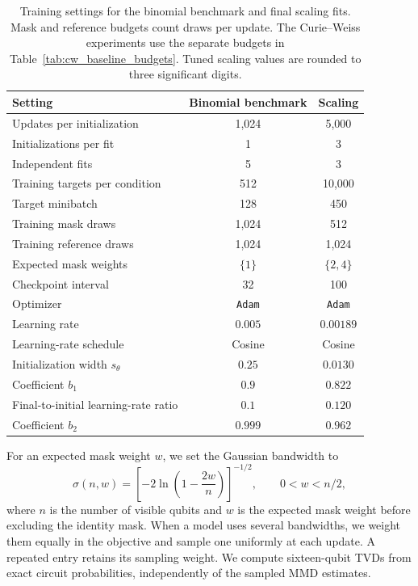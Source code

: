 \documentclass[pra,aps,10pt,twocolumn,floatfix,superscriptaddress, notitlepage,longbibliography]{revtex4-2}
\begin{document}
\begin{table}[!htbp]
\centering
\caption{Training settings for the binomial benchmark and final scaling fits. Mask and reference budgets count draws per update. The Curie--Weiss experiments use the separate budgets in Table~\ref{tab:cw_baseline_budgets}. Tuned scaling values are rounded to three significant digits.}
\label{tab:training_hyperparams}
\small
\begin{tabular}{lcc}
\toprule
Setting & Binomial benchmark & Scaling \\
\midrule
Updates per initialization & 1,024 & 5,000 \\
Initializations per fit & 1 & 3 \\
Independent fits & 5 & 3 \\
Training targets per condition & 512 & 10,000 \\
Target minibatch & 128 & 450 \\
Training mask draws & 1,024 & 512 \\
Training reference draws & 1,024 & 1,024 \\
Expected mask weights & $\{1\}$ & $\{2,4\}$ \\
Checkpoint interval & 32 & 100 \\
Optimizer & \texttt{Adam} & \texttt{Adam} \\
Learning rate & $0.005$ & $0.00189$ \\
Learning-rate schedule & Cosine & Cosine \\
Initialization width $s_\theta$ & $0.25$ & $0.0130$ \\
Coefficient $b_1$ & $0.9$ & $0.822$ \\
Final-to-initial learning-rate ratio & $0.1$ & $0.120$ \\
Coefficient $b_2$ & $0.999$ & $0.962$ \\
\bottomrule
\end{tabular}
\end{table}

For an expected mask weight $w$, we set the Gaussian bandwidth to
\begin{equation}
    \sigma(n,w)=\left[-2\ln\left(1-\frac{2w}{n}\right)\right]^{-1/2},
    \qquad 0<w<n/2,
\end{equation}
where $n$ is the number of visible qubits and $w$ is the expected mask weight before excluding the identity mask. When a model uses several bandwidths, we weight them equally in the objective and sample one uniformly at each update. A repeated entry retains its sampling weight. We compute sixteen-qubit TVDs from exact circuit probabilities, independently of the sampled MMD estimates.
\end{document}
